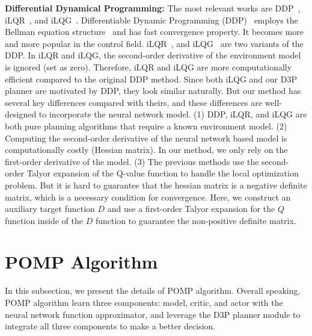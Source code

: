 \documentclass{article} %
\newcommand{\yue}[1]{ {#1}}
\begin{document}
\yue{
\textbf{Differential Dynamical Programming:}
The most relevant works are DDP~\citep{murray1984differential}, iLQR~\citep{li2004iterative}, and  iLQG~\citep{tassa2012synthesis}. Differentiable Dynamic Programming (DDP)~\citep{tassa2012synthesis} employs the Bellman equation structure~\citep{murray1984differential,de1988differential,aoyama2021constrained} and has fast convergence property.  It becomes more and more popular in the control field. iLQR~\citep{li2004iterative}, and iLQG~\citep{tassa2012synthesis,todorov2005generalized} are two variants of the DDP. In iLQR and iLQG, the second-order derivative of the environment model is ignored (set as zero). Therefore, iLQR and iLQG are more computationally efficient compared to the original DDP method.	Since both iLQG and our D3P planner are motivated by DDP, they look similar naturally. But our method has several key differences compared with theirs, and these differences are well-designed to incorporate the neural network model. (1) DDP, iLQR, and iLQG are both pure planning algorithms that require a known environment model.  (2) Computing the second-order derivative of the neural network based model is computationally costly (Hessian matrix). In our method, we only rely on the first-order derivative of the model. (3) The previous methods use the second-order Talyor expansion of the Q-value function to handle the local optimization problem. But it is hard to guarantee that the hessian matrix is a negative definite matrix, which is a necessary condition for convergence. Here, we construct an auxiliary target function $D$ and use a first-order Talyor expansion for the $Q$ function inside of the $D$ function to guarantee the non-positive definite matrix. }







\section{POMP Algorithm}\label{sec:append pompalg}


In this subsection, we present the details of POMP algorithm. Overall speaking, POMP algorithm  learn three components: model, critic, and actor with the neural network function approximator, and leverage the D3P planner module to integrate all three components to make a better decision. 
\end{document}

